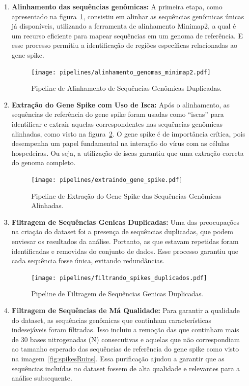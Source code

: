 \begin{enumerate}
  \item \textbf{Alinhamento das sequências genômicas:} A primeira etapa, como apresentado na figura~\ref{fig:alinhamentoGenomas}, consistiu em alinhar as sequências genômicas únicas já disponíveis, utilizando a ferramenta de alinhamento Minimap2, a qual é um recurso eficiente para mapear sequências em um genoma de referência. E esse processo permitiu a identificação de regiões específicas relacionadas ao gene spike.
        \begin{figure}[htb]
          \centering
          \caption{Pipeline de Alinhamento de Sequências Genômicas Duplicadas.}
          \texttt{[image: pipelines/alinhamento\_genomas\_minimap2.pdf]}
          ~\label{fig:alinhamentoGenomas}
        \end{figure}
  \item \textbf{Extração do Gene Spike com Uso de Isca:} Após o alinhamento, as sequências de referência do gene spike foram usadas como ``iscas'' para identificar e extrair aquelas correspondentes nas sequências genômicas alinhadas, como visto na figura~\ref{fig:extracaoSpike}. O gene spike é de importância crítica, pois desempenha um papel fundamental na interação do vírus com as células hospedeiras. Ou seja, a utilização de iscas garantiu que uma extração correta do genoma completo.
        \begin{figure}[htb]
          \centering
          \caption{Pipeline de Extração do Gene Spike das Sequências Genômicas Alinhadas.}
          \texttt{[image: pipelines/extraindo\_gene\_spike.pdf]}
          ~\label{fig:extracaoSpike}
        \end{figure}
  \item \textbf{Filtragem de Sequências Genicas Duplicadas:} Uma das preocupações na criação do dataset foi a presença de sequências duplicadas, que podem enviesar os resultados da análise. Portanto, as que estavam repetidas foram identificadas e removidas do conjunto de dados. Esse processo garantiu que cada sequência fosse única, evitando redundâncias.
        \begin{figure}[htb]
          \centering
          \caption{Pipeline de Filtragem de Sequências Genicas Duplicadas.}
          \texttt{[image: pipelines/filtrando\_spikes\_duplicados.pdf]}
          ~\label{fig:spikeDuplicados}
        \end{figure}
  \item \textbf{Filtragem de Sequências de Má Qualidade:} Para garantir a qualidade do dataset, as sequências genômicas que continham características indesejáveis foram filtradas. Isso incluiu a remoção das que continham mais de 30 bases nitrogenadas (N) consecutivas e aquelas que não correspondiam ao tamanho esperado das sequências de referência do gene spike como visto na imagem~\ref{fig:spikesRuins}. Essa purificação ajudou a garantir que as sequências incluídas no dataset fossem de alta qualidade e relevantes para a análise subsequente.

\end{enumerate}
